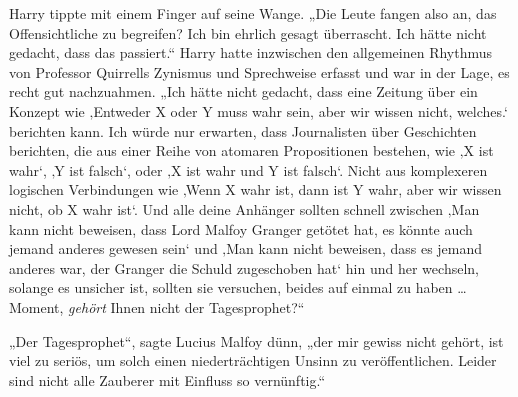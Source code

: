 Harry tippte mit einem Finger auf seine Wange.
„Die Leute fangen also an, das Offensichtliche zu begreifen? Ich bin ehrlich gesagt überrascht. Ich hätte nicht gedacht, dass das passiert.“
Harry hatte inzwischen den allgemeinen Rhythmus von Professor Quirrells Zynismus und Sprechweise erfasst und war in der Lage, es recht gut nachzuahmen.
„Ich hätte nicht gedacht, dass eine Zeitung über ein Konzept wie ‚Entweder X oder Y muss wahr sein, aber wir wissen nicht, welches.‘ berichten kann. Ich würde nur erwarten, dass Journalisten über Geschichten berichten, die aus einer Reihe von atomaren Propositionen bestehen, wie ‚X ist wahr‘, ‚Y ist falsch‘, oder ‚X ist wahr und Y ist falsch‘. Nicht aus komplexeren logischen Verbindungen wie ‚Wenn X wahr ist, dann ist Y wahr, aber wir wissen nicht, ob X wahr ist‘. Und alle deine Anhänger sollten schnell zwischen ‚Man kann nicht beweisen, dass Lord Malfoy Granger getötet hat, es könnte auch jemand anderes gewesen sein‘ und ‚Man kann nicht beweisen, dass es jemand anderes war, der Granger die Schuld zugeschoben hat‘ hin und her wechseln, solange es unsicher ist, sollten sie versuchen, beides auf einmal zu haben … Moment, \emph{gehört} Ihnen nicht der Tagesprophet?“

„Der Tagesprophet“, sagte Lucius Malfoy dünn, „der mir gewiss nicht gehört, ist viel zu seriös, um solch einen niederträchtigen Unsinn zu veröffentlichen. Leider sind nicht alle Zauberer mit Einfluss so vernünftig.“

